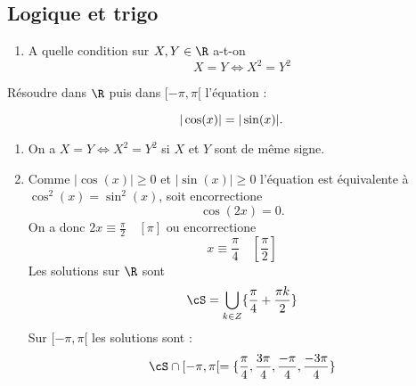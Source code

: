 \subsection{Logique et trigo}

\begin{exercice}
\begin{enumerate}
\item A quelle condition sur $X,Y\in \R$ a-t-on 
$$X=Y \Longleftrightarrow X^2=Y^2  $$
\end{enumerate}
\item Résoudre dans $\R$ puis dans $[-\pi, \pi[$ l'équation :

\begin{equation}
|\cos(x)|=|\sin(x)|.\\
\end{equation}

\end{exercice}

\begin{correction}
\begin{enumerate}
\item On a  $X=Y \Longleftrightarrow X^2=Y^2  $ si $X$ et $Y$ sont de même signe.
\item Comme $|\cos(x)|\geq 0$ et $|\sin(x)|\geq 0$ l'équation est équivalente à $\cos^2(x) =\sin^2(x)$, soit encorrectione 
$$\cos(2x)=0.$$
On a donc $2x\equiv \frac{\pi}{2}\quad [\pi]$ ou encorrectione 
$$x\equiv \frac{\pi}{4}\quad [\frac{\pi}{2}]$$
 Les solutions sur $\R$ sont 
 $$\cS =\bigcup_{k\in Z} \{ \frac{\pi}{4}+\frac{\pi k}{2}\}$$
 Sur $[-\pi, \pi[$  les solutions sont :
 $$\cS\cap [-\pi, \pi[ =  \{ \frac{\pi}{4}, \frac{3\pi}{4}, \frac{-\pi}{4}, \frac{-3\pi}{4}\}$$
 




\end{enumerate}
\end{correction}